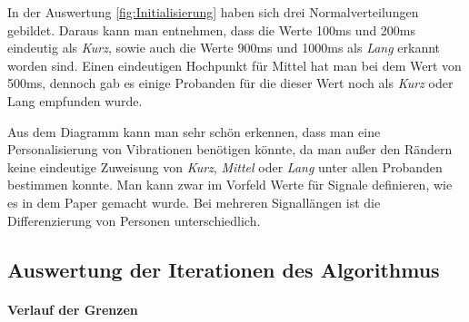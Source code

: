 
In der Auswertung \autoref{fig:Initialisierung} haben sich drei Normalverteilungen gebildet. 
Daraus kann man entnehmen, dass die Werte 100ms und 200ms eindeutig als \textit{Kurz}, sowie auch die Werte 900ms und 1000ms als \textit{Lang} erkannt worden sind. 
Einen eindeutigen Hochpunkt f{\"u}r Mittel hat man bei dem Wert von 500ms, dennoch gab es einige Probanden f{\"u}r die dieser Wert noch als \textit{Kurz} oder Lang empfunden wurde. 

Aus dem Diagramm kann man sehr sch{\"o}n erkennen, dass man eine Personalisierung von Vibrationen ben{\"o}tigen k{\"o}nnte, da man au{\ss}er den R{\"a}ndern keine eindeutige Zuweisung von \textit{Kurz}, \textit{Mittel} oder \textit{Lang} unter allen Probanden bestimmen konnte. 
Man kann zwar im Vorfeld Werte f{\"u}r Signale definieren, wie es in dem Paper \cite{pescara2016ruttelflug} gemacht wurde. Bei mehreren Signall{\"a}ngen ist die Differenzierung von Personen unterschiedlich.

\subsection{Auswertung der Iterationen des Algorithmus}


\paragraph{Verlauf der Grenzen}

